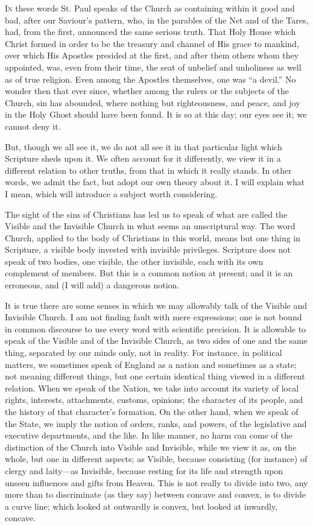 I\textsc{n} these words St. Paul speaks of the Church as containing within
it good and bad, after our Saviour's pattern, who, in the parables of
the Net and of the Tares, had, from the first, announced the same
serious truth. That Holy House which Christ formed in order to be the
treasury and channel of His grace to mankind, over which His Apostles
presided at the first, and after them others whom they appointed, was,
even from their time, the seat of unbelief and unholiness as well as
of true religion. Even among the Apostles themselves, one was ``a
devil.'' No wonder then that ever since, whether among the rulers
or the subjects of the Church, sin has abounded, where nothing but
righteousness, and peace, and joy in the Holy Ghost should have been
found. It is so at this day; our eyes see it; we cannot deny it.

But, though we all see it, we do not all see it in that particular
light which Scripture sheds upon it. We often account for it
differently, we view it in a different relation to other truths, from
that in which it really stands. In other words, we admit the fact, but
adopt our own theory about it. I will explain what I mean, which will
introduce a subject worth considering.

The sight of the sins of Christians has led us to speak of what are
called the Visible and the Invisible Church in what seems an
unscriptural way. The word Church, applied to the body of Christians
in this world, means but one thing in Scripture, a visible body
invested with invisible privileges. Scripture does not speak of two
bodies, one visible, the other invisible, each with its own complement
of members. But this is a common notion at present; and it is an
erroneous, and (I will add) a dangerous notion.

It is true there are some senses in which we may allowably talk of
the Visible and Invisible Church. I am not finding fault with mere
expressions; one is not bound in common discourse to use every word
with scientific precision. It is allowable to speak of the Visible and
of the Invisible Church, as two sides of one and the same thing,
separated by our minds only, not in reality. For instance, in
political matters, we sometimes speak of England as a nation and
sometimes as a state; not meaning different things, but one certain
identical thing viewed in a different relation. When we speak of the
Nation, we take into account its variety of local rights, interests,
attachments, customs, opinions; the character of its people, and the
history of that character's formation. On the other hand, when we
speak of the State, we imply the notion of orders, ranks, and powers,
of the legislative and executive departments, and the like. In like
manner, no harm can come of the distinction of the Church into Visible
and Invisible, while we view it as, on the whole, but one in different
aspects; as Visible, because consisting (for instance) of clergy and
laity—as Invisible, because resting for its life and strength upon
unseen influences and gifts from Heaven. This is not really to divide
into two, any more than to discriminate (as they say) between concave
and convex, is to divide a curve line; which looked at outwardly is
convex, but looked at inwardly, concave.


